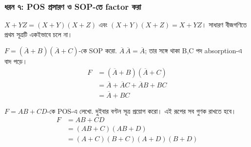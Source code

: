 \subsubsection*{ধরন ৭: POS প্রসারণ ও SOP-তে factor করা}
$X+YZ=(X+Y)(X+Z)$ এবং $(X+Y)(X+Z)=X+YZ$। সাধারণ বীজগণিতে প্রথম সূত্রটি একইভাবে চলে না।
\par\smallskip\noindent\begin{minipage}{\linewidth}
$F=(\overline A+B)(\overline A+C)$-কে SOP করো.
\chThreeAnswer $\overline A\,\overline A=\overline A$; তার সঙ্গে থাকা B,C পদ absorption-এ বাদ পড়ে।
\[\begin{aligned}F&=(\overline A+B)(\overline A+C)\\
&=\overline A+\overline AC+\overline AB+BC\\
&=\overline A+BC\end{aligned}\]

\end{minipage}\par\smallskip
\par\smallskip\noindent\begin{minipage}{\linewidth}
$F=AB+CD$-কে POS-এ লেখো.
\chThreeAnswer দুইবার বণ্টন সূত্র প্রয়োগ করো। এই রূপের সব গুণক রাখতে হবে।
\[\begin{aligned}F&=AB+CD\\
&=(AB+C)(AB+D)\\
&=(A+C)(B+C)(A+D)(B+D)\end{aligned}\]

\end{minipage}\par\smallskip
{}
